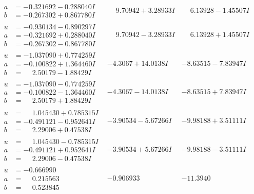\documentclass[1p]{elsarticle_modified}
\theoremstyle{definition}
\begin{document}
$$\begin{array}{c|c|c}
\begin{aligned}
a &= -0.321692 - 0.288040 I \\
b &= -0.267302 + 0.867780 I\end{aligned}
 & \phantom{-}9.70942 + 3.28933 I & \phantom{-}6.13928 - 1.45507 I \\ \hline\begin{aligned}
u &= -0.930134 - 0.890297 I \\
a &= -0.321692 + 0.288040 I \\
b &= -0.267302 - 0.867780 I\end{aligned}
 & \phantom{-}9.70942 - 3.28933 I & \phantom{-}6.13928 + 1.45507 I \\ \hline\begin{aligned}
u &= -1.037090 + 0.774259 I \\
a &= -0.100822 + 1.364460 I \\
b &= \phantom{-}2.50179 - 1.88429 I\end{aligned}
 & -4.3067 + 14.0138 I & -8.63515 - 7.83947 I \\ \hline\begin{aligned}
u &= -1.037090 - 0.774259 I \\
a &= -0.100822 - 1.364460 I \\
b &= \phantom{-}2.50179 + 1.88429 I\end{aligned}
 & -4.3067 - 14.0138 I & -8.63515 + 7.83947 I \\ \hline\begin{aligned}
u &= \phantom{-}1.045430 + 0.785315 I \\
a &= -0.491121 - 0.952641 I \\
b &= \phantom{-}2.29006 + 0.47538 I\end{aligned}
 & -3.90534 - 5.67266 I & -9.98188 + 3.51111 I \\ \hline\begin{aligned}
u &= \phantom{-}1.045430 - 0.785315 I \\
a &= -0.491121 + 0.952641 I \\
b &= \phantom{-}2.29006 - 0.47538 I\end{aligned}
 & -3.90534 + 5.67266 I & -9.98188 - 3.51111 I \\ \hline\begin{aligned}
u &= -0.666990\phantom{ +0.000000I} \\
a &= \phantom{-}0.215563\phantom{ +0.000000I} \\
b &= \phantom{-}0.523845\phantom{ +0.000000I}\end{aligned}
 & -0.906933\phantom{ +0.000000I} & -11.3940\phantom{ +0.000000I} \\ \hline\begin{aligned}

\end{aligned}
\end{array}$$
\end{document}

